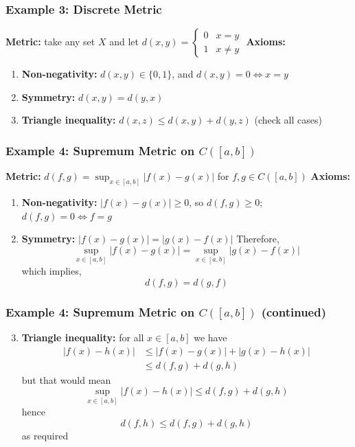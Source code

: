 \documentclass{beamer}
\begin{document}
\begin{frame}
    \frametitle{Example 3: Discrete Metric}
    \textbf{Metric:} take any set $X$ and let $d(x, y) = \begin{cases} 0 & x = y \\ 1 & x \neq y \end{cases}$\pause
    \newline
    \textbf{Axioms:}
    \begin{enumerate}
        \item \textbf{Non-negativity:} $d(x, y) \in \{0, 1\}$, and $d(x, y) = 0 \iff x = y$ \pause
        \item \textbf{Symmetry:} $d(x, y) = d(y, x)$\pause
        \item \textbf{Triangle inequality:} $d(x, z) \leq d(x, y) + d(y, z)$ (check all cases)
    \end{enumerate}
\end{frame}

\begin{frame}
    \frametitle{Example 4: Supremum Metric on $C([a, b])$}
    \textbf{Metric:} $d(f, g) = \sup_{x \in [a, b]} |f(x) - g(x)|$ for $f, g \in C([a, b])$ \pause
    \newline
    \textbf{Axioms:}
    \begin{enumerate}
        \item \textbf{Non-negativity:} $|f(x) - g(x)| \geq 0$, so $d(f, g) \geq 0$; $d(f, g) = 0 \iff f = g$ \pause
        \item \textbf{Symmetry:} $|f(x) - g(x)| = |g(x) - f(x)|$ Therefore, \[\sup_{x \in [a, b]} |f(x) - g(x)| = \sup_{x \in [a, b]} |g(x) - f(x)|\]
        which implies,
        \[d(f, g) = d(g, f)\]
    \end{enumerate}
\end{frame}

\begin{frame}
    \frametitle{Example 4: Supremum Metric on $C([a, b])$ (continued)}

    \begin{enumerate}
        \setcounter{enumi}{2}
        \item \textbf{Triangle inequality:} for all $x\in[a, b]$ we have 
        \begin{align*}
            |f(x) - h(x)| &\leq |f(x) - g(x)| + |g(x) - h(x)| \\
            &\leq d(f, g)+d(g, h)
        \end{align*}
        but that would mean
        \[\sup_{x \in [a, b]} |f(x) - h(x)| \leq d(f, g) + d(g, h)\]
        hence
        \[d(f, h) \leq d(f, g) + d(g, h)\] as required
    \end{enumerate}

\end{frame}
\end{document}
